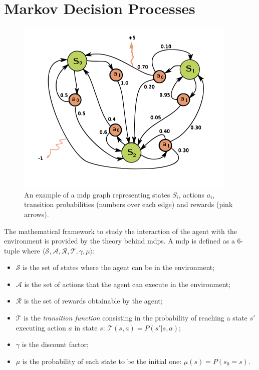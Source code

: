 \section{Markov Decision Processes}
\begin{figure}[t]
\begin{minipage}{\textwidth}
\begin{center}
  \includegraphics[scale=.6]{img/mdp2.png}
\end{center}
\end{minipage}
\caption[Example of a Markov Decision Process]{An example of a \gls{mdp} graph representing states $S_i$, actions $a_i$, transition probabilities (numbers over each edge) and rewards (pink arrows).}\label{F:mdp2}
\end{figure}
The mathematical framework to study the interaction of the agent with the environment is provided by the theory behind \glspl{mdp}. A \gls{mdp} is defined as a $6$-tuple where $\langle \mathcal{S}, \mathcal{A}, \mathcal{R}, \mathcal{T}, \gamma, \mu \rangle$:
\begin{itemize}
 \item $\mathcal{S}$ is the set of states where the agent can be in the environment;
 \item $\mathcal{A}$ is the set of actions that the agent can execute in the environment;
 \item $\mathcal{R}$ is the set of rewards obtainable by the agent;
 \item $\mathcal{T}$ is the \textit{transition function} consisting in the probability of reaching a state $s'$ executing action $a$ in state $s$: $\mathcal{T}(s, a) = P(s' | s, a)$;
 \item $\gamma$ is the discount factor;
 \item $\mu$ is the probability of each state to be the initial one: $\mu(s) = P(s_0 = s)$.
\end{itemize}
